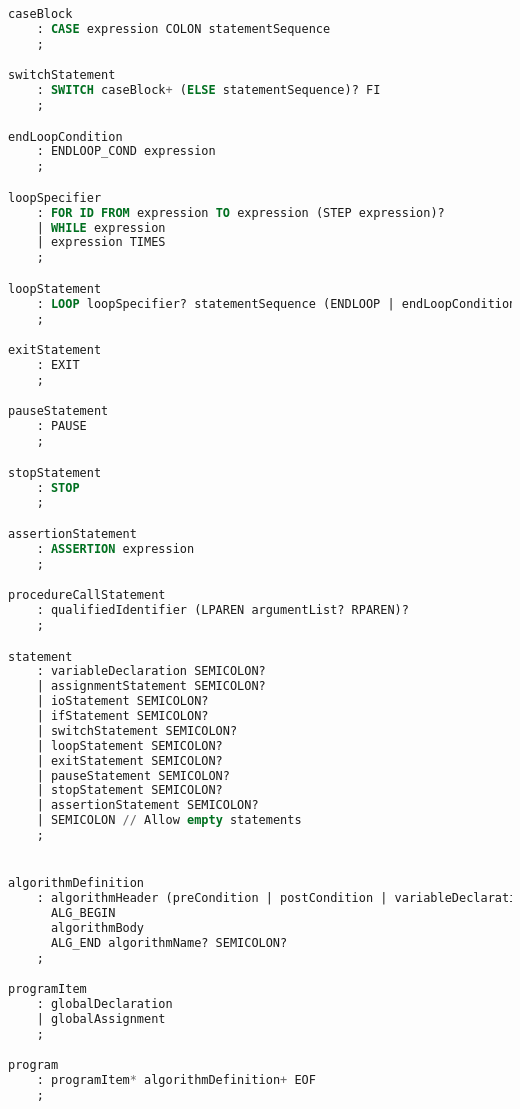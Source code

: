 \begin{lstlisting}[language=sql, caption={Парсер грамматики в формате ANTRL}, label=lst:kafka-click2]
caseBlock
    : CASE expression COLON statementSequence
    ;

switchStatement
    : SWITCH caseBlock+ (ELSE statementSequence)? FI
    ;

endLoopCondition
    : ENDLOOP_COND expression
    ;

loopSpecifier
    : FOR ID FROM expression TO expression (STEP expression)?
    | WHILE expression
    | expression TIMES
    ;

loopStatement
    : LOOP loopSpecifier? statementSequence (ENDLOOP | endLoopCondition)
    ;

exitStatement
    : EXIT
    ;

pauseStatement
    : PAUSE
    ;

stopStatement
    : STOP
    ;

assertionStatement
    : ASSERTION expression
    ;

procedureCallStatement
    : qualifiedIdentifier (LPAREN argumentList? RPAREN)?
    ;

statement
    : variableDeclaration SEMICOLON?
    | assignmentStatement SEMICOLON?
    | ioStatement SEMICOLON?
    | ifStatement SEMICOLON?
    | switchStatement SEMICOLON?
    | loopStatement SEMICOLON?
    | exitStatement SEMICOLON?
    | pauseStatement SEMICOLON?
    | stopStatement SEMICOLON?
    | assertionStatement SEMICOLON?
    | SEMICOLON // Allow empty statements
    ;


algorithmDefinition
    : algorithmHeader (preCondition | postCondition | variableDeclaration)*
      ALG_BEGIN
      algorithmBody
      ALG_END algorithmName? SEMICOLON? 
    ;

programItem
    : globalDeclaration
    | globalAssignment
    ;

program
    : programItem* algorithmDefinition+ EOF
    ;
\end{lstlisting}

\newpage